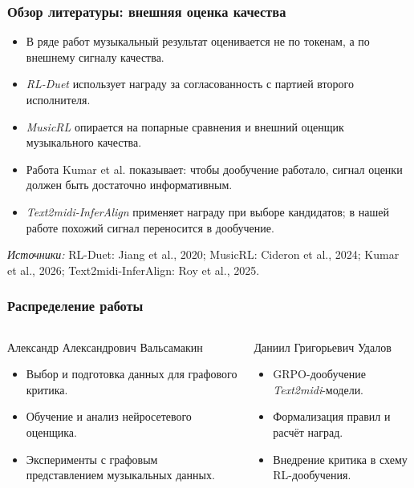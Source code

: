 \documentclass[aspectratio=169]{beamer}
\newcommand{\litrefs}[1]{\vfill{\scriptsize\textit{Источники:} #1}}
\begin{document}
\begin{frame}
\frametitle{Обзор литературы: внешняя оценка качества}
\begin{itemize}
    \item В ряде работ музыкальный результат оценивается не по токенам, а по внешнему сигналу качества.
    \item \textit{RL-Duet} использует награду за согласованность с партией второго исполнителя.
    \item \textit{MusicRL} опирается на попарные сравнения и внешний оценщик музыкального качества.
    \item Работа Kumar et al. показывает: чтобы дообучение работало, сигнал оценки должен быть достаточно информативным.
    \item \textit{Text2midi-InferAlign} применяет награду при выборе кандидатов; в нашей работе похожий сигнал переносится в дообучение.
\end{itemize}

\litrefs{RL-Duet: Jiang et al., 2020; MusicRL: Cideron et al., 2024; Kumar et al., 2026; Text2midi-InferAlign: Roy et al., 2025.}
\end{frame}
\begin{frame}
\frametitle{Распределение работы}
\small
\begin{columns}[T,totalwidth=\textwidth]
\begin{block}{Александр Александрович Вальсамакин}
\begin{itemize}
    \item Выбор и подготовка данных для графового критика.
    \item Обучение и анализ нейросетевого оценщика.
    \item Эксперименты с графовым представлением музыкальных данных.
\end{itemize}
\end{block}

\begin{block}{Даниил Григорьевич Удалов}
\begin{itemize}
    \item GRPO-дообучение \textit{Text2midi}-модели.
    \item Формализация правил и расчёт наград.
    \item Внедрение критика в схему RL-дообучения.
\end{itemize}
\end{block}
\end{columns}
\end{frame}
\end{document}
